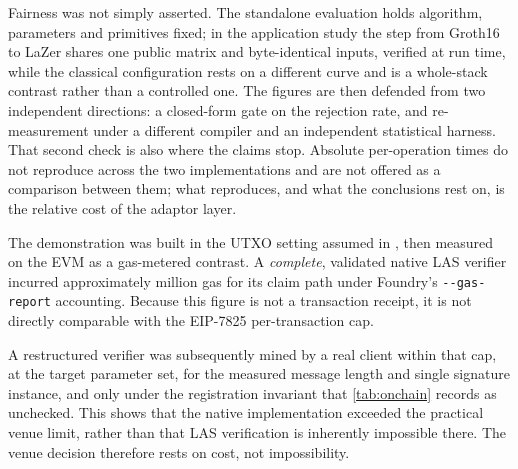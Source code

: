 \enlargethispage{\baselineskip}
Fairness was not simply asserted. The standalone evaluation holds algorithm, parameters
and primitives fixed; in the application study the step from Groth16 to LaZer shares one
public matrix and byte-identical inputs, verified at run time, while the classical
configuration rests on a different curve and is a whole-stack contrast rather than a
controlled one. The figures are then defended from two independent directions: a
closed-form gate on the rejection rate, and re-measurement under a different compiler and
an independent statistical harness. That second check is also where the claims stop.
Absolute per-operation times do not reproduce across the two implementations and are not
offered as a comparison between them; what reproduces, and what the conclusions rest on,
is the relative cost of the adaptor layer.

The demonstration was built in the UTXO setting assumed in \cite{esgin2020post}, then
measured on the EVM as a gas-metered contrast. A \emph{complete}, validated native LAS
verifier incurred approximately \gasLasVerifiedM{} million gas for its claim path under
Foundry's \texttt{-{}-gas-report} accounting. Because this figure is not a transaction
receipt, it is not directly comparable with the EIP-7825 per-transaction cap.


A restructured verifier was subsequently mined by a real client within that cap, at the
target parameter set, for the measured message length and single signature instance, and
only under the registration invariant that \cref{tab:onchain} records as unchecked.
This shows that the native implementation exceeded the practical venue limit, rather than
that LAS verification is inherently impossible there. The venue decision therefore rests
on cost, not impossibility.

